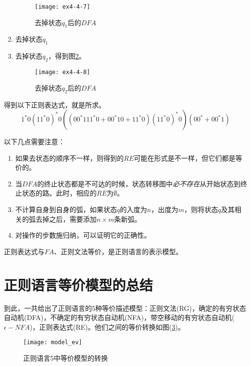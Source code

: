 \begin{example}
\begin{enumerate}
        \begin{figure}[htbp]
        	\texttt{[image: ex4-4-7]}
        	\caption{去掉状态$q_1$后的$DFA$}
        	\label{fig:ex4-4-7}       %
        \end{figure}\item 去掉状态$q_1$
        \item 去掉状态$q_2$，得到图\ref{fig:ex4-4-8}。
	    \begin{figure}[htbp]
	    \texttt{[image: ex4-4-8]}
	    \caption{去掉状态$q_2$后的$DFA$}
	    \label{fig:ex4-4-8}       %
		\end{figure}
	\end{enumerate}

得到以下正则表达式，就是所求。
$$1^\ast 0(11^\ast 0)^\ast 0((00^\ast 111^\ast 0+00^\ast 10+11^\ast 0)(11^\ast 0)^\ast 0)(00^\ast+00^\ast 1)$$ 
\end{example}

\begin{note}
	以下几点需要注意：
	\begin{enumerate}
		\item 如果去状态的顺序不一样，则得到的$RE$可能在形式是不一样，但它们都是等价的。 
		\item 当$DFA$的终止状态都是不可达的时候，状态转移图中\emph{必不存在}从开始状态到终止状态的路。此时，相应的$RE$为$\emptyset$。
		\item 不计算自身到自身的弧，如果状态$q$的入度为$n$，出度为$m$，则将状态$q$及其相关的弧去掉之后，需要添加$n\times m$条新弧。 
		\item 对操作的步数施归纳，可以证明它的正确性。	
	\end{enumerate}
\end{note}

\begin{corollary}
	正则表达式与$FA$、正则文法等价，是正则语言的表示模型。
\end{corollary}

\section{正则语言等价模型的总结}
到此，一共给出了正则语言的5种等价描述模型：正则文法(RG)，确定的有穷状态自动机(DFA)，不确定的有穷状态自动机(NFA)，带空移动的有穷状态自动机($\epsilon -NFA$)，正则表达式(RE)。他们之间的等价转换如图(\ref{fig:model_ev})。
\begin{figure}[htbp]
	\texttt{[image: model\_ev]}
	\caption{正则语言5中等价模型的转换}
	\label{fig:model_ev}       %
\end{figure}

